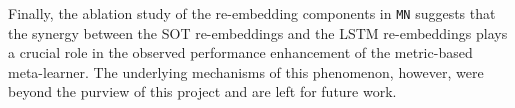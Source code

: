 Finally, the ablation study of the re-embedding components in \texttt{MN} suggests that the synergy between the SOT re-embeddings and the LSTM re-embeddings plays a crucial role in the observed performance enhancement of the metric-based meta-learner. The underlying mechanisms of this phenomenon, however, were beyond the purview of this project and are left for future work.
